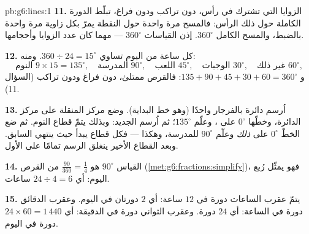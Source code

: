 \begin{solution}{pb:g6:lines:1}
\textbf{11.} الزوايا التي تشترك في رأس، دون تراكب ودون
فراغ، تبلّط الدورة الكاملة حول ذلك الرأس: فالمسح مرة واحدة حول
النقطة يمرّ بكل زاوية مرة واحدة بالضبط، والمسح
الكامل $360^\circ$. إذن  القياسات $360^\circ$ ---
مهما كان عدد الزوايا وأحجامها.

\textbf{12.} كل ساعة من اليوم تساوي
$360 \div 24 = 15^\circ$. ومنه:
\[
\text{النوم } 9 \times 15 = 135^\circ, \quad
\text{المدرسة } 90^\circ, \quad
\text{اللعب } 45^\circ, \quad
\text{الوجبات } 30^\circ, \quad
\text{غير ذلك } 60^\circ,
\]
و $135 + 90 + 45 + 30 + 60 = 360^\circ$: فالقرص ممتلئ، دون
فراغ ودون تراكب (السؤال 11).

\textbf{13.} اُرسم دائرة بالفرجار  واحدًا (وهو
خط البداية). وضع مركز المنقلة على مركز
الدائرة، وخطّها $0^\circ$ على ، وعلّم
$135^\circ$؛ ثم اُرسم  الجديد: وبذلك يتمّ قطاع النوم. ثم
ضع الخطّ $0^\circ$ على \emph{ذلك}  وعلّم
$90^\circ$ للمدرسة، وهكذا --- فكل قطاع يبدأ حيث
ينتهي السابق. وبعد القطاع الأخير ينغلق الرسم
تمامًا على  الأول.

\textbf{14.} القياس $90^\circ$ هو $\frac{90}{360} = \frac14$ من
القرص (\cref{met:g6:fractions:simplify})، فهو يمثّل
رُبع اليوم: أي $24 \div 4 = 6$ ساعات.

\textbf{15.} يتمّ عقرب الساعات دورة في $12$ ساعة: أي $2$
دورتان في اليوم. وعقرب الدقائق دورة في الساعة: أي $24$ دورة.
وعقرب الثواني دورة في الدقيقة: أي $24 \times 60 = 1\,440$
دورة في اليوم.
\end{solution}
